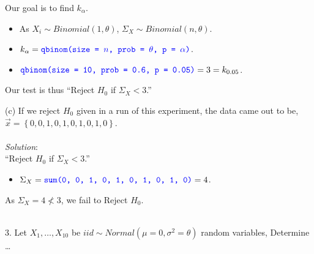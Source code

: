 \documentclass[12pt]{article}
\newcommand{\XB}{\color{black}}
\newcommand{\XBB}{\color{blue}}
\newcommand{\ds}{\displaystyle}
\begin{document}
\noindent
Our goal is to find $ k_{\alpha} $. \\

\begin{itemize}
    \item As $ X_{i} \sim Binomial(1, \theta) $, $ \Sigma_{X} \sim Binomial(n, \theta) $.
    \item $ \ds k_{\alpha} = {\XBB \texttt{qbinom(size = $ n $, prob = $ \theta $, p = $ \alpha $)}} $.
    \item $ \ds {\XBB \texttt{qbinom(size = 10, prob = 0.6, p = 0.05)}} = 3 = k_{0.05} $.
\end{itemize}

\noindent
Our test is thus ``Reject $ H_{0} $ if $ \Sigma_{X} < 3 $.'' \\

\vspace{2.5mm}

\newpage 

(c) If we reject $ H_{0} $ given in a run of this experiment, the data came out to be, 
$ \overrightarrow{x}  = \left\{ 0, 0, 1, 0, 1, 0, 1, 0, 1, 0 \right\} $. \\
\vspace{2.5mm} \\
\textit{Solution}:
\vspace{2.5mm} \\

\noindent
``Reject $ H_{0} $ if $ \Sigma_{X} < 3 $.''

\begin{itemize}
    \item $ \ds \Sigma_{X} = {\XBB \texttt{sum(0, 0, 1, 0, 1, 0, 1, 0, 1, 0)}} = 4 $.
\end{itemize}
As $ \Sigma_{X} = 4 \nless 3 $, we fail to Reject $ H_{0} $. \\

\vspace{2.5mm}

\newpage
\XBB\hrulefill\XB \\

3. Let $ X_{1}, \dots , X_{10} $ be $ iid \sim Normal(\mu=0, \sigma^{2}=\theta) $ random variables, Determine \dots \\
\end{document}
